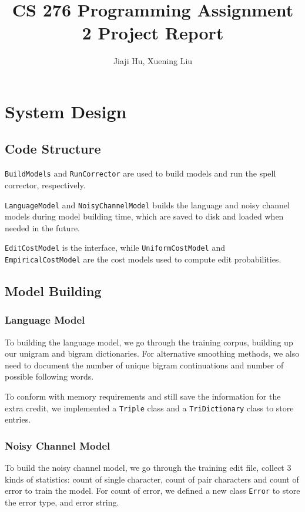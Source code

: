 \documentclass[10pt,twocolumn]{article}
\begin{document}
\title{CS 276 Programming Assignment 2 Project Report}
\author{Jiaji Hu, Xuening Liu}
\date{}
\maketitle

\section{System Design}
\subsection{Code Structure}
\texttt{BuildModels} and \texttt{RunCorrector} are used to build models and run the spell corrector, respectively.

\texttt{LanguageModel} and \texttt{NoisyChannelModel} builds the language and noisy channel models during model building time, which are saved to disk and loaded when needed in the future.

\texttt{EditCostModel} is the interface, while \texttt{UniformCostModel} and \texttt{EmpiricalCostModel} are the cost models used to compute edit probabilities.
\subsection{Model Building}
\subsubsection{Language Model}
To building the language model, we go through the training corpus, building up our unigram and bigram dictionaries. For alternative smoothing methods, we also need to document the number of unique bigram continuations and number of possible following words.

To conform with memory requirements and still save the information for the extra credit, we implemented a \texttt{Triple} class and a \texttt{TriDictionary} class to store entries.
\subsubsection{Noisy Channel Model}
To build the noisy channel model, we go through the training edit file, collect 3 kinds of statistics: count of single character, count of pair characters and count of error to train the model. For count of error, we defined a new class \texttt{Error} to store the error type, and error string.
\end{document}
